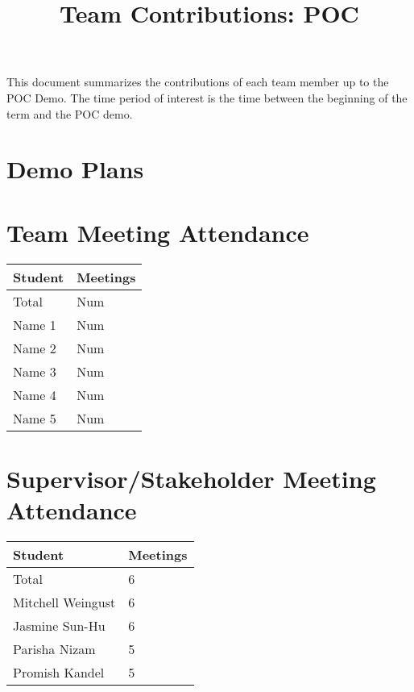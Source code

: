 \documentclass{article}
\title{Team Contributions: POC\\\progname}
\author{\authname}
\date{}
\begin{document}
\maketitle

This document summarizes the contributions of each team member up to the POC
Demo.  The time period of interest is the time between the beginning of the term
and the POC demo.

\section{Demo Plans}


\section{Team Meeting Attendance}


\begin{table}[H]
\centering
\begin{tabular}{ll}
\toprule
\textbf{Student} & \textbf{Meetings}\\
\midrule
Total & Num\\
Name 1 & Num\\
Name 2 & Num\\
Name 3 & Num\\
Name 4 & Num\\
Name 5 & Num\\
\bottomrule
\end{tabular}
\end{table}


\section{Supervisor/Stakeholder Meeting Attendance}

\begin{table}[H]
\centering
\begin{tabular}{ll}
\toprule
\textbf{Student} & \textbf{Meetings}\\
\midrule
Total & 6\\
Mitchell Weingust & 6\\
Jasmine Sun-Hu & 6\\
Parisha Nizam & 5\\
Promish Kandel & 5\\
\bottomrule
\end{tabular}
\end{table}
\end{document}
